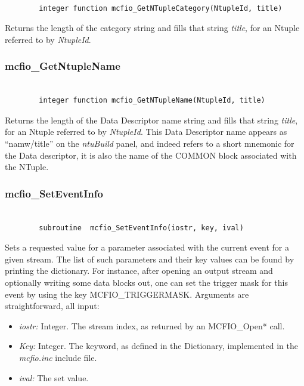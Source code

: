 \begin{verbatim}

        integer function mcfio_GetNTupleCategory(NtupleId, title)

\end{verbatim}

Returns the length of the category string and fills that string {\em
title}, for an Ntuple referred to by {\em NtupleId}.

\subsubsection{mcfio\_GetNtupleName}

\begin{verbatim}

        integer function mcfio_GetNTupleName(NtupleId, title)

\end{verbatim}

Returns the length of the Data Descriptor name string and fills that string {\em
title}, for an Ntuple referred to by {\em NtupleId}.  This Data Descriptor name appears as
``namw/title'' on the {\em ntuBuild} panel, and indeed refers to a short mnemonic
for the Data descriptor, it is also the name of the COMMON block associated
with the NTuple.


\subsubsection{mcfio\_SetEventInfo}

\begin{verbatim}

        subroutine  mcfio_SetEventInfo(iostr, key, ival)

\end{verbatim}

Sets a requested  value for a parameter associated with the current
event for a given stream. The list of such parameters and their key values
can be found by printing the dictionary. For instance, after opening an output
stream and optionally writing some data blocks out, one can set the trigger
mask for this event by using the key
MCFIO\_TRIGGERMASK. Arguments are straightforward, all input:

\begin{itemize}
\item {\em iostr:} Integer. The stream index, as returned by an MCFIO\_Open*
call.
\item {\em Key:} Integer.  The keyword, as defined in the Dictionary,
implemented in the {\em mcfio.inc} include file.
\item {\em ival:} The  set value.
\end{itemize}

